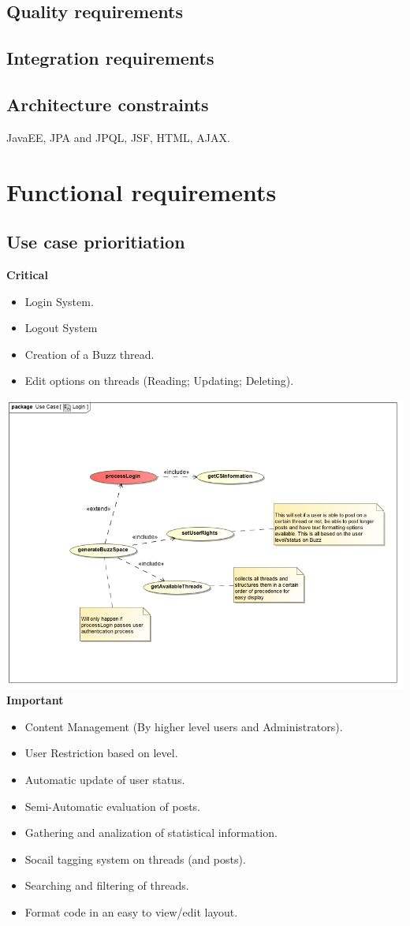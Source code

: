 \documentclass[a4paper,12pt]{report}
\begin{document}
\subsection{Quality requirements}
\subsection{Integration requirements}
\subsection{Architecture constraints}
JavaEE, JPA and JPQL, JSF, HTML,
AJAX.
\section{Functional requirements}
\subsection{Use case prioritiation}
\textbf{Critical} 
\begin{itemize}
  \item Login System.  
  \item Logout System
  \item Creation of a Buzz thread.
  \item Edit options on threads (Reading; Updating; Deleting).
\end{itemize}
  \includegraphics[width=1\textwidth]{./UseCase_Login.jpg}\\[0.4cm]  
\textbf{Important} 
\begin{itemize}
  \item Content Management (By higher level users and Administrators).
  \item User Restriction based on level.
  \item Automatic update of user status.
  \item Semi-Automatic evaluation of posts.
  \item Gathering and analization of statistical information.
  \item Socail tagging system on threads (and posts).
  \item Searching and filtering of threads.
  \item Format code in an easy to view/edit layout. 
\end{itemize}
\end{document}
